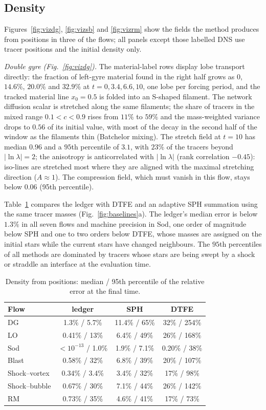 \documentclass[11pt]{article}
\theoremstyle{definition}\newtheorem{definition}{Definition}\theoremstyle{remark}\newtheorem{remark}{Remark}
\begin{document}
\subsection{Density}
Figures~\ref{fig:vizdg}, \ref{fig:vizsb} and \ref{fig:vizrm} show the fields the method produces from positions in three of the flows; all panels except those labelled DNS use tracer positions and the initial density only.

\emph{Double gyre (Fig.~\ref{fig:vizdg}).} The material-label rows display lobe transport directly: the fraction of left-gyre material found in the right half grows as $0$, $14.6\%$, $20.0\%$ and $32.9\%$ at $t=0,3.4,6.6,10$, one lobe per forcing period, and the tracked material line $x_0=0.5$ is folded into an S-shaped filament. The network diffusion scalar is stretched along the same filaments; the share of tracers in the mixed range $0.1<c<0.9$ rises from $11\%$ to $59\%$ and the mass-weighted variance drops to $0.56$ of its initial value, with most of the decay in the second half of the window as the filaments thin (Batchelor mixing). The stretch field at $t=10$ has median $0.96$ and a $95$th percentile of $3.1$, with $23\%$ of the tracers beyond $|\ln\lambda|=2$; the anisotropy is anticorrelated with $|\ln\lambda|$ (rank correlation $-0.45$): iso-lines are stretched most where they are aligned with the maximal stretching direction ($A\approx1$). The compression field, which must vanish in this flow, stays below $0.06$ (95th percentile).

Table~\ref{tab:density} compares the ledger with DTFE and an adaptive SPH summation using the same tracer masses (Fig.~\ref{fig:baselines}a). The ledger's median error is below $1.3\%$ in all seven flows and machine precision in Sod, one order of magnitude below SPH and one to two orders below DTFE, whose masses are assigned on the initial stars while the current stars have changed neighbours. The $95$th percentiles of all methods are dominated by tracers whose stars are being swept by a shock or straddle an interface at the evaluation time.

\begin{table}[t]\centering\small\caption{Density from positions: median / 95th percentile of the relative error at the final time.}\label{tab:density}
\begin{tabular}{lccc}\toprule
Flow & ledger & SPH & DTFE\\\midrule
DG & 1.3\% / 5.7\% & 11.4\% / 65\% & 32\% / 254\%\\
LO & 0.41\% / 13\% & 6.4\% / 49\% & 26\% / 168\%\\
Sod & $<10^{-13}$ / 1.0\% & 1.9\% / 7.1\% & 0.20\% / 38\%\\
Blast & 0.58\% / 32\% & 6.8\% / 39\% & 20\% / 107\%\\
Shock--vortex & 0.34\% / 3.4\% & 3.4\% / 32\% & 17\% / 98\%\\
Shock--bubble & 0.67\% / 30\% & 7.1\% / 44\% & 26\% / 142\%\\
RM & 0.73\% / 35\% & 4.6\% / 41\% & 17\% / 73\%\\\bottomrule
\end{tabular}\end{table}
\end{document}

